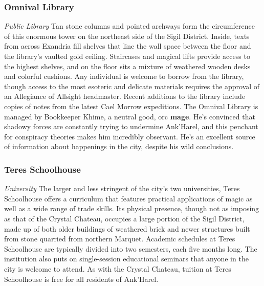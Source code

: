 \documentclass[10pt,a4,twoside,twocolumn,openany,nodeprecatedcode]{dndbook}
\begin{document}
\subsubsection{Omnival Library}
\textit{Public Library}
Tan stone columns and pointed archways form the circumference of this enormous tower on the northeast side of the Sigil District. Inside, texts from across Exandria fill shelves that line the wall space between the floor and the library's vaulted gold ceiling. Staircases and magical lifts provide access to the highest shelves, and on the floor sits a mixture of weathered wooden desks and colorful cushions.
Any individual is welcome to borrow from the library, though access to the most esoteric and delicate materials requires the approval of an Allegiance of Allsight headmaster. Recent additions to the library include copies of notes from the latest Cael Morrow expeditions.
The Omnival Library is managed by Bookkeeper Khime, a neutral good, orc \textbf{mage}. He's convinced that shadowy forces are constantly trying to undermine Ank'Harel, and this penchant for conspiracy theories makes him incredibly observant. He's an excellent source of information about happenings in the city, despite his wild conclusions.
\subsubsection{Teres Schoolhouse}
\textit{University}
The larger and less stringent of the city's two universities, Teres Schoolhouse offers a curriculum that features practical applications of magic as well as a wide range of trade skills. Its physical presence, though not as imposing as that of the Crystal Chateau, occupies a large portion of the Sigil District, made up of both older buildings of weathered brick and newer structures built from stone quarried from northern Marquet.
Academic schedules at Teres Schoolhouse are typically divided into two semesters, each five months long. The institution also puts on single-session educational seminars that anyone in the city is welcome to attend. As with the Crystal Chateau, tuition at Teres Schoolhouse is free for all residents of Ank'Harel.
\end{document}
